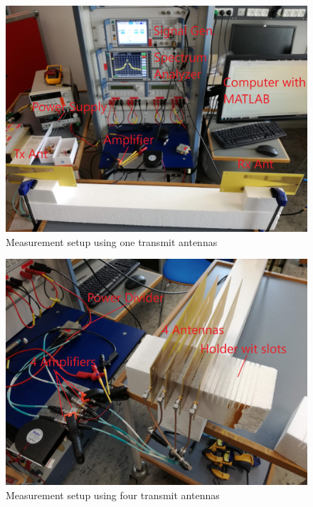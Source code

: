 \begin{figure}[H]
\centering 
\includegraphics[scale = 0.1]{figures/measurement/measurement_setup.jpg}
\caption{Measurement setup using one transmit antennas}
\label{fig:Meas_setup}
\end{figure} 

\begin{figure}[H]
\centering 
\includegraphics[scale = 0.1]{figures/measurement/measurement_setup_4.jpg}
\caption{Measurement setup using four transmit antennas}
\label{fig:Meas_setup4ant}
\end{figure} 


